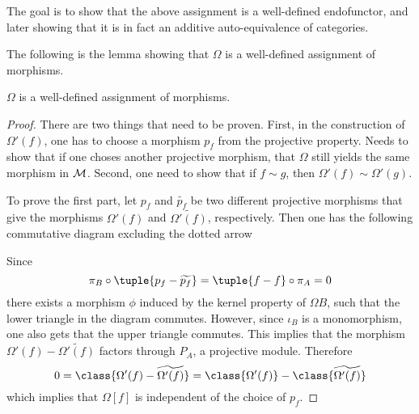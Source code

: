 The goal is to show that the above assignment is a well-defined endofunctor, and later showing that it is in fact an additive auto-equivalence of categories.

The following is the lemma showing that \( \Omega \) is a well-defined assignment of morphisms.

\begin{lemma}
    \label{lem:stmod_omega_f_is_well_defined}
    \( \Omega \) is a well-defined assignment of morphisms.
\end{lemma}
\begin{proof}
    There are two things that need to be proven. First, in the construction of \( \Omega'(f) \), one has to choose a morphism \( p_f \) from the projective property. Needs to show that if one choses another projective morphism, that \( \Omega \) still yields the same morphism in \( {\mathcal{M}} \). Second, one need to show that if \( f \sim g \), then \( \Omega'(f) \sim \Omega'(g) \).

    To prove the first part, let \( p_f \) and \( \widetilde{p_f} \) be two different projective morphisms that give the morphisms \( \Omega'(f) \) and \( \widetilde{\Omega'(f)} \), respectively. Then one has the following commutative diagram excluding the dotted arrow
    \begin{center}
    \end{center}

    Since
    \[
        \pi_B \circ \tuple{p_f - \widetilde{p_f}} = \tuple{f - f} \circ \pi_A = 0
    \]
    there exists a morphism \( \phi \) induced by the kernel property of \( \Omega B \), such that the lower triangle in the diagram commutes. However, since \( \iota_B \) is a monomorphism, one also gets that the upper triangle commutes. This implies that the morphism \( \Omega'(f) - \widetilde{\Omega'(f)} \) factors through \( P_A \), a projective module. Therefore
    \[
        0 = \class{\Omega'(f) - \widetilde{\Omega'(f)}} = \class{\Omega'(f)} - \class{\widetilde{\Omega'(f)}}
    \]
    which implies that \( \Omega [f] \) is independent of the choice of \( p_f \).


\end{proof}
